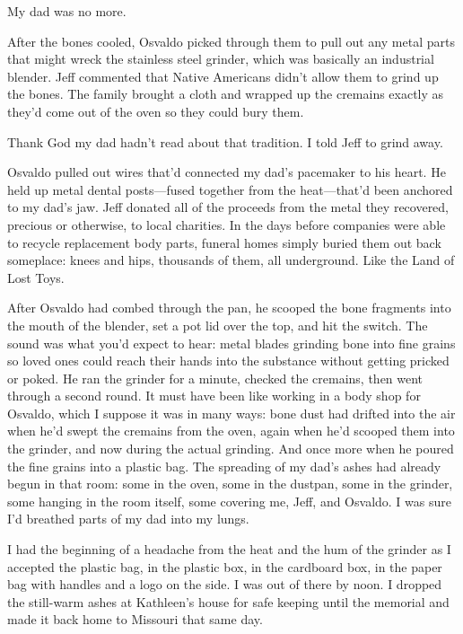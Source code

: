 \documentclass[12pt]{book}
\begin{document}
My dad was no more.

After the bones cooled, Osvaldo picked through them to pull out any metal parts that might wreck the stainless steel grinder, which was basically an industrial blender. Jeff commented that Native Americans didn't allow them to grind up the bones. The family brought a cloth and wrapped up the cremains exactly as they'd come out of the oven so they could bury them.

Thank God my dad hadn't read about that tradition. I told Jeff to grind away.

Osvaldo pulled out wires that'd connected my dad's pacemaker to his heart. He held up metal dental posts---fused together from the heat---that'd been anchored to my dad's jaw. Jeff donated all of the proceeds from the metal they recovered, precious or otherwise, to local charities. In the days before companies were able to recycle replacement body parts, funeral homes simply buried them out back someplace: knees and hips, thousands of them, all underground. Like the Land of Lost Toys.

After Osvaldo had combed through the pan, he scooped the bone fragments into the mouth of the blender, set a pot lid over the top, and hit the switch. The sound was what you'd expect to hear: metal blades grinding bone into fine grains so loved ones could reach their hands into the substance without getting pricked or poked. He ran the grinder for a minute, checked the cremains, then went through a second round. It must have been like working in a body shop for Osvaldo, which I suppose it was in many ways: bone dust had drifted into the air when he'd swept the cremains from the oven, again when he'd scooped them into the grinder, and now during the actual grinding. And once more when he poured the fine grains into a plastic bag. The spreading of my dad's ashes had already begun in that room: some in the oven, some in the dustpan, some in the grinder, some hanging in the room itself, some covering me, Jeff, and Osvaldo. I was sure I'd breathed parts of my dad into my lungs.

I had the beginning of a headache from the heat and the hum of the grinder as I accepted the plastic bag, in the plastic box, in the cardboard box, in the paper bag with handles and a logo on the side. I was out of there by noon. I dropped the still-warm ashes at Kathleen's house for safe keeping until the memorial and made it back home to Missouri that same day. 


\chapter{}
\end{document}
